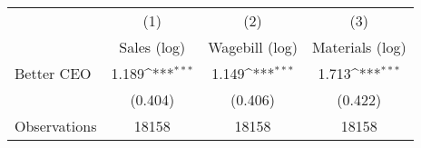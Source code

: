 {
\def\sym#1{\ifmmode^{#1}\else\(^{#1}\)\fi}
\begin{tabular}{l*{3}{c}}
\hline\hline
                    &\multicolumn{1}{c}{(1)}&\multicolumn{1}{c}{(2)}&\multicolumn{1}{c}{(3)}\\
                    &\multicolumn{1}{c}{Sales (log)}&\multicolumn{1}{c}{Wagebill (log)}&\multicolumn{1}{c}{Materials (log)}\\
\hline
Better CEO          &       1.189\sym{***}&       1.149\sym{***}&       1.713\sym{***}\\
                    &     (0.404)         &     (0.406)         &     (0.422)         \\
\hline
Observations        &       18158         &       18158         &       18158         \\
\hline\hline
\end{tabular}
}
